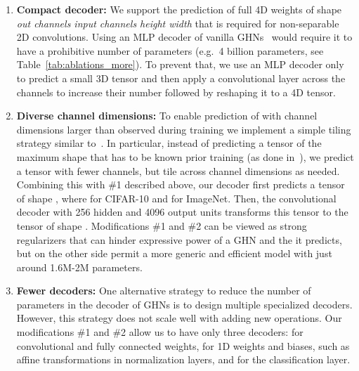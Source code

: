 \begin{enumerate}
	
	\item \textbf{Compact decoder:} We support the prediction of full 4D weights of shape \textit{out channels  input channels  height  width}	
	that is required for non-separable 2D convolutions.
	Using an MLP decoder of vanilla GHNs~\cite{zhang2018graph} would require it to have a prohibitive number of parameters (e.g.~4 billion parameters, see Table~\ref{tab:ablations_more}).
	To prevent that, we use an MLP decoder only to predict a small 3D tensor and then apply a  convolutional layer across the channels to increase their number followed by reshaping it to a 4D tensor.
	
	\item  \textbf{Diverse channel dimensions:}
	To enable prediction of \params with channel dimensions larger than observed during training we implement a simple tiling strategy similar to~\cite{ha2016hypernetworks}. In particular, instead of predicting a tensor of the maximum shape that has to be known prior training (as done in~\cite{zhang2018graph}), we predict a tensor with fewer channels, but tile across channel dimensions as needed.
	Combining this with \#1 described above, our decoder first predicts a tensor of shape , where  for CIFAR-10 and  for ImageNet. Then, the  convolutional decoder with 256 hidden and 4096 output units transforms this tensor to the tensor of shape .
	Modifications \#1 and \#2 can be viewed as strong regularizers that can hinder expressive power of a GHN and the \params it predicts, but on the other side permit a more generic and efficient model with just around 1.6M-2M parameters.
	
	\item  \textbf{Fewer decoders:} One alternative strategy to reduce the number of parameters in the decoder of GHNs is to design multiple specialized decoders. However, this strategy does not scale well with adding new operations. Our modifications \#1 and \#2 allow us to have only three decoders:
	for convolutional and fully connected weights, for 1D weights and biases, such as affine transformations in normalization layers, and for the classification layer. 
	

\end{enumerate}
